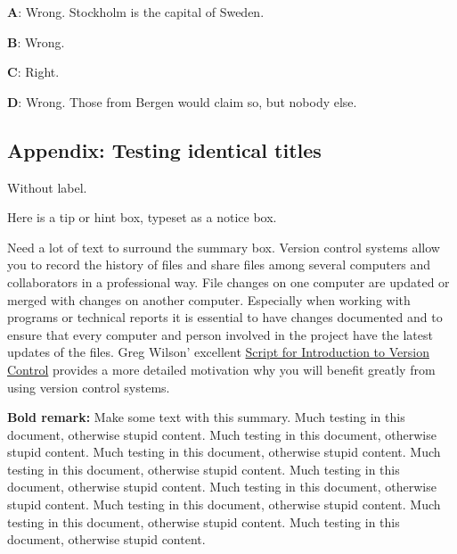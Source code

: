 \documentclass[%
oneside,                 %
final,                   %
10pt]{article}
\newenvironment{doconcequiz}{}{}
\newenvironment{notice_mdfboxadmon}[1][]{
\begin{notice_mdfboxmdframed}[frametitle=#1]
}
{
\end{notice_mdfboxmdframed}
}
\newenvironment{summary_mdfboxadmon}[1][]{
\begin{summary_mdfboxmdframed}[frametitle=#1]
}
{
\end{summary_mdfboxmdframed}
}
\theoremstyle{definition}
\begin{document}
\begin{enumerate}
\begin{doconcequiz}
\textbf{A}: Wrong. Stockholm is the capital of Sweden.

\textbf{B}: Wrong. 

\textbf{C}: Right. 

\textbf{D}: Wrong. Those from Bergen would claim so, but nobody else.




\vspace{3mm}

\end{doconcequiz}


\subsection{Appendix: Testing identical titles}
Without label.

\begin{notice_mdfboxadmon}[Tip.]
Here is a tip or hint box, typeset as a notice box.
\end{notice_mdfboxadmon} %


\clearpage
Need a lot of text to surround the summary box.
Version control systems allow you to record the history of files
and share files among several computers and collaborators in a
professional way. File changes on one computer are updated or
merged with changes on another computer. Especially when working
with programs or technical reports it is essential
to have changes documented and to
ensure that every computer and person involved in the project
have the latest updates of the files.
Greg Wilson' excellent \href{{https://software-carpentry.org/2010/07/script-for-introduction-to-version-control/}}{Script for Introduction to Version Control} provides a more detailed motivation why you will benefit greatly
from using version control systems.

\begin{summary_mdfboxadmon}[Summary.]
\textbf{Bold remark:} Make some text with this summary.
Much testing in this document, otherwise stupid content.
Much testing in this document, otherwise stupid content.
Much testing in this document, otherwise stupid content.
Much testing in this document, otherwise stupid content.
Much testing in this document, otherwise stupid content.
Much testing in this document, otherwise stupid content.
Much testing in this document, otherwise stupid content.
Much testing in this document, otherwise stupid content.
Much testing in this document, otherwise stupid content.
\end{summary_mdfboxadmon} %



\end{enumerate}
\end{document}
